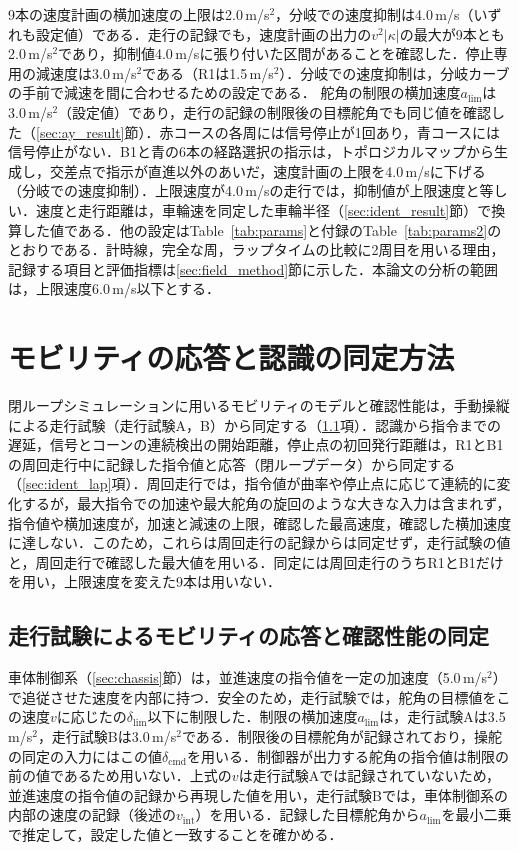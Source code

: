 9本の速度計画の横加速度の上限は2.0\,m/s$^2$，分岐での速度抑制は4.0\,m/s（いずれも設定値）である．走行の記録でも，速度計画の出力の$v^2|\kappa|$の最大が9本とも2.0\,m/s$^2$であり，抑制値4.0\,m/sに張り付いた区間があることを確認した．停止専用の減速度は3.0\,m/s$^2$である（R1は1.5\,m/s$^2$）．分岐での速度抑制は，分岐カーブの手前で減速を間に合わせるための設定である．
舵角の制限の横加速度$a_{\mathrm{lim}}$は3.0\,m/s$^2$（設定値）であり，走行の記録の制限後の目標舵角でも同じ値を確認した（\ref{sec:ay_result}節）．赤コースの各周には信号停止が1回あり，青コースには信号停止がない．B1と青の6本の経路選択の指示は，トポロジカルマップから生成し，交差点で指示が直進以外のあいだ，速度計画の上限を4.0\,m/sに下げる（分岐での速度抑制）．上限速度が4.0\,m/sの走行では，抑制値が上限速度と等しい．速度と走行距離は，車輪速を同定した車輪半径（\ref{sec:ident_result}節）で換算した値である．他の設定はTable~\ref{tab:params}と付録のTable~\ref{tab:params2}のとおりである．計時線，完全な周，ラップタイムの比較に2周目を用いる理由，記録する項目と評価指標は\ref{sec:field_method}節に示した．本論文の分析の範囲は，上限速度6.0\,m/s以下とする．

\section{モビリティの応答と認識の同定方法}
\label{sec:identification}
閉ループシミュレーションに用いるモビリティのモデルと確認性能は，手動操縦による走行試験（走行試験A，B）から同定する（\ref{sec:ident_test}項）．認識から指令までの遅延，信号とコーンの連続検出の開始距離，停止点の初回発行距離は，R1とB1の周回走行中に記録した指令値と応答（閉ループデータ）から同定する（\ref{sec:ident_lap}項）．周回走行では，指令値が曲率や停止点に応じて連続的に変化するが，最大指令での加速や最大舵角の旋回のような大きな入力は含まれず，指令値や横加速度が，加速と減速の上限，確認した最高速度，確認した横加速度に達しない．このため，これらは周回走行の記録からは同定せず，走行試験の値と，周回走行で確認した最大値を用いる．同定には周回走行のうちR1とB1だけを用い，上限速度を変えた9本は用いない．

\subsection{走行試験によるモビリティの応答と確認性能の同定}
\label{sec:ident_test}
車体制御系（\ref{sec:chassis}節）は，並進速度の指令値を一定の加速度（5.0\,m/s$^2$）で追従させた速度を内部に持つ．安全のため，走行試験では，舵角の目標値をこの速度$v$に応じたの$\delta_{\mathrm{lim}}$以下に制限した．制限の横加速度$a_{\mathrm{lim}}$は，走行試験Aは3.5\,m/s$^2$，走行試験Bは3.0\,m/s$^2$である．制限後の目標舵角が記録されており，操舵の同定の入力にはこの値$\delta_{\mathrm{cmd}}$を用いる．制御器が出力する舵角の指令値は制限の前の値であるため用いない．上式の$v$は走行試験Aでは記録されていないため，並進速度の指令値の記録から再現した値を用い，走行試験Bでは，車体制御系の内部の速度の記録（後述の$v_{\mathrm{int}}$）を用いる．記録した目標舵角から$a_{\mathrm{lim}}$を最小二乗で推定して，設定した値と一致することを確かめる．

